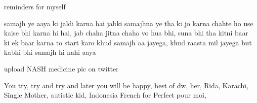 reminders for myself

samajh ye aaya ki jaldi karna hai jabki samajhna ye tha ki jo karna chahte ho use kaise bhi karna hi hai, jab chaha jitna chaha vo hua bhi, suna bhi tha kitni baar ki ek baar karna to start karo khud samajh aa jayega, khud raasta mil jayega but kabhi bhi samajh hi nahi aaya

upload NASH medicine pic on twitter

You try, try and try and later you will be happy, best of dw, her, Rida, Karachi, Single Mother, autistic kid, Indonesia
French for Perfect pour moi, 
